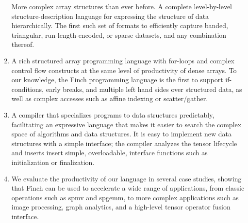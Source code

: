 \begin{enumerate}
More complex array structures than ever before. A complete level-by-level
structure-description language for expressing the structure of data
hierarchically. The first such set of formats to efficiently capture banded,
triangular, run-length-encoded, or sparse datasets, and any combination thereof.
\item A rich structured array programming language with for-loops
and complex control flow constructs at the same level of productivity
of dense arrays. To our knowledge, the Finch programming language is the first 
to support if-conditions, early breaks, and multiple left hand sides over
structured data, as well as complex accesses such as affine indexing or scatter/gather.  
\item A compiler that specializes programs to data structures 
predictably, facilitating an expressive language that makes it easier to search the complex
space of algorithms and data structures. It is easy to implement new data structures with a simple interface; the compiler analyzes the tensor lifecycle and inserts insert simple, overloadable, interface functions such as
initialization or finalization.
\item We evaluate the productivity of our language in several case studies,
showing that Finch can be used to accelerate a wide range of applications, 
from classic operations such as spmv and spgemm, to more complex applications such as image processing, graph analytics, and a high-level tensor operator fusion interface. 

\end{enumerate}
